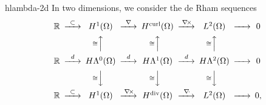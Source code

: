 \begin{Notation}{hlambda-2d}
  In two dimensions, we consider the de Rham sequences
  \begin{gather}\minCDarrowwidth20pt
    \begin{CD}
      \R
      @>{\subset}>> H^1(\domain)
      @>{\nabla}>> \Hcurl(\domain)
      @>{\curl}>> L^2(\domain)
      @>>> 0
      \\
      @.
      @A{\cong}AA
      @A{\cong}AA
      @A{\cong}AA
      \\
      \R
      @>{d}>> H\Lambda^0(\domain)
      @>{d}>> H\Lambda^1(\domain)
      @>{d}>> H\Lambda^2(\domain)
      @>>> 0
      \\
      @.
      @V{\cong}VV
      @V{\cong}VV
      @V{\cong}VV
      \\
      \R
      @>{\subset}>> H^1(\domain)
      @>{\curl}>> \Hdiv(\domain)
      @>{\div}>> L^2(\domain)
      @>>> 0,
    \end{CD}
  \end{gather}
\end{Notation}

